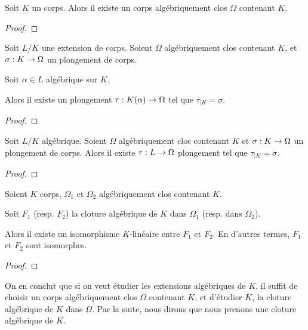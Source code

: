 \begin{theorem}
	Soit $K$ un corps. Alors il existe un corps algébriquement clos $\Omega$
	contenant $K$.
\end{theorem}

\ifdefined\outputproof
\begin{proof}

\end{proof}
\fi

\begin{lemma}
	Soit $L/K$ une extension de corps. Soient $\Omega$ algébriquement clos
	contenant $K$, et
	$\sigma : K \rightarrow \Omega$ un plongement de corps.

	Soit $\alpha \in L$ algébrique sur $K$.

	Alors il existe un plongement $\tau : K(\alpha) \rightarrow \Omega$ tel que
	$\tau_{|K} = \sigma$.
\end{lemma}

\ifdefined\outputproof
\begin{proof}

\end{proof}
\fi

\begin{theorem} 
	Soit $L/K$ algébrique.
	Soient $\Omega$ algébriquement clos contenant $K$ et
	$\sigma : K \rightarrow \Omega$ un plongement de corps.
	Alors il existe $\tau : L \rightarrow \Omega$ plongement tel que $\tau_{|K}
	= \sigma$.
\end{theorem}

\ifdefined\outputproof
\begin{proof}

\end{proof}
\fi

\begin{corollary}
	Soient $K$ corps, $\Omega_{1}$ et $\Omega_{2}$ algébriquement clos contenant
	$K$.

	Soit $F_{1}$ (resp. $F_{2}$) la cloture algébrique de $K$ dans $\Omega_{1}$
	(resp. dans $\Omega_{2}$).

	Alors il existe un isomorphisme $K$-linéaire entre $F_{1}$ et
	$F_{2}$. En d'autres termes, $F_{1}$ et $F_{2}$ sont isomorphes.
\end{corollary}

\ifdefined\outputproof
\begin{proof}

\end{proof}
\fi

On en conclut que si on veut étudier les extensions algébriques de $K$, il
suffit de choisir un corps algébriquement clos $\Omega$ contenant $K$, et
d'étudier $\overline{K}$, la cloture algébrique de $K$ dans $\Omega$. Par la
suite, nous dirons que nous prenons une cloture algébrique de $K$.

